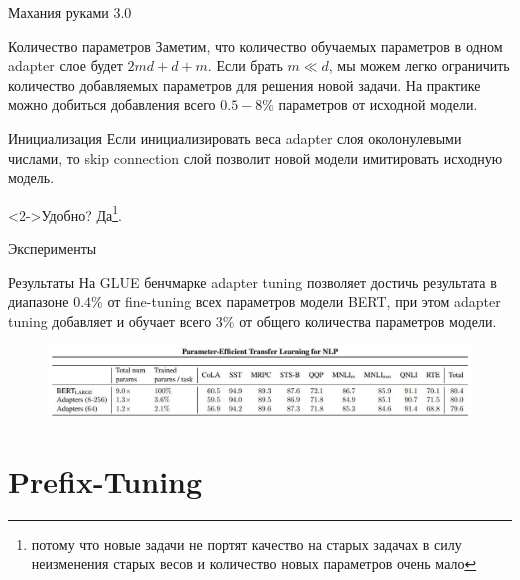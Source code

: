 \documentclass[9pt]{beamer}
\begin{document}
\begin{frame}{Махания руками 3.0}

    \begin{block}{Количество параметров}
        Заметим, что количество обучаемых параметров в одном adapter слое будет $2 m d + d + m$. Если брать $m \ll d$, мы можем легко ограничить количество добавляемых параметров для решения новой задачи. На практике можно добиться добавления всего $0.5 - 8\%$ параметров от исходной модели.
    \end{block}

    \begin{block}{Инициализация}
        Если инициализировать веса adapter слоя околонулевыми числами, то skip connection слой позволит новой модели имитировать исходную модель.
    \end{block}

    \begin{block}<2->{Удобно?}
        Да\footnote{потому что новые задачи не портят качество на старых задачах в силу неизменения старых весов и количество новых параметров очень мало}.
    \end{block}
    
\end{frame}


\begin{frame}{Эксперименты}
    
    \begin{block}{Результаты}
        На GLUE бенчмарке adapter tuning позволяет достичь результата в диапазоне $0.4\%$ от fine-tuning всех параметров модели BERT, при этом adapter tuning добавляет и обучает всего $3\%$ от общего количества параметров модели.
    \end{block}

    \begin{figure}
        \begin{center}
            \includegraphics[scale=0.45]{images/adapter_2.jpg}
        \end{center}
    \end{figure}

\end{frame}


\section{Prefix-Tuning}
\end{document}
